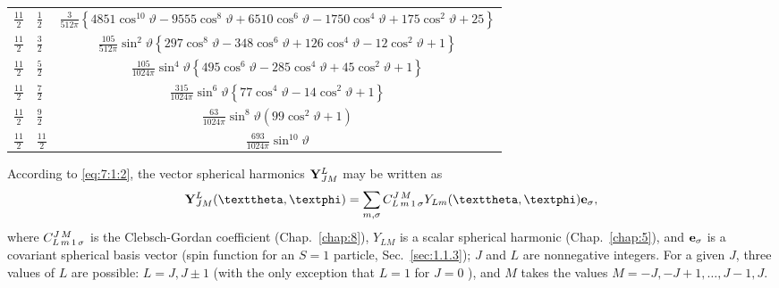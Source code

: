 \begin{table}[tbh]
\begin{center}
\begin{tabular}{l|l|c}
$\frac{11}{2}$ & $\frac{1}{2}$ & $\frac{3}{512 \pi}\left\{4851 \cos ^{10} \vartheta-9555 \cos ^{8} \vartheta+6510 \cos ^{6} \vartheta-1750 \cos ^{4} \vartheta+175 \cos ^{2} \vartheta+25\right\}$ \\
$\frac{11}{2}$ & $\frac{3}{2}$ & $\frac{105}{512 \pi} \sin ^{2} \vartheta\left\{297 \cos ^{8} \vartheta-348 \cos ^{6} \vartheta+126 \cos ^{4} \vartheta-12 \cos ^{2} \vartheta+1\right\}$ \\
$\frac{11}{2}$ & $\frac{5}{2}$ & $\frac{105}{1024 \pi} \sin ^{4} \vartheta\left\{495 \cos ^{6} \vartheta-285 \cos ^{4} \vartheta+45 \cos ^{2} \vartheta+1\right\}$ \\
$\frac{11}{2}$ & $\frac{7}{2}$ & $\frac{315}{1024 \pi} \sin ^{6} \vartheta\left\{77 \cos ^{4} \vartheta-14 \cos ^{2} \vartheta+1\right\}$ \\
$\frac{11}{2}$ & $\frac{9}{2}$ & $\frac{63}{1024 \pi} \sin ^{8} \vartheta\left(99 \cos ^{2} \vartheta+1\right)$ \\
$\frac{11}{2}$ & $\frac{11}{2}$ & $\frac{693}{1024 \pi} \sin ^{10} \vartheta$ 
\end{tabular}
\end{center}
\end{table}

According to \eqref{eq:7:1:2}, the vector spherical harmonics $\mathbf{Y}_{J M}^{L}$ may be written as
\begin{equation}
\vect{Y}_{J M}^{L}(\vartheta, \varphi)=\sum_{m, \sigma} \clebsch{L}{m}{1}{\sigma}{J}{M} Y_{L m}(\vartheta, \varphi) \vect{e}_{\sigma}, \label{eq:7:3:3}
\end{equation}
where $C_{L\,m\,1\,\sigma}^{J\,M}$ is the Clebsch-Gordan coefficient (Chap.~\ref{chap:8}), $Y_{L M}$ is a scalar spherical harmonic (Chap.~\ref{chap:5}), and $\mathbf{e}_{\sigma}$ is a covariant spherical basis vector (spin function for an $S=1$ particle, Sec.~\ref{sec:1.1.3}); $J$ and $L$ are nonnegative integers. For a given $J$, three values of $L$ are possible: $L=J, J \pm 1$ (with the only exception that $L=1$ for $J=0$ ), and $M$ takes the values $M=-J,-J+1, \ldots, J-1, J$.

